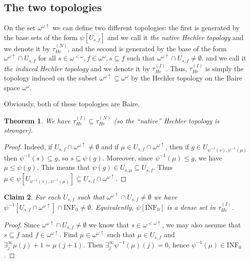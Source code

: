 \documentclass[12pt]{amsart}
\theoremstyle{plain}
\newtheorem{theorem}{Theorem}[section]
\newtheorem{claim}[theorem]{Claim}
\theoremstyle{definition}
\theoremstyle{remark}
\newcommand{\baire}{\omega^{\omega}}
\newcommand{\finbaire}{\omega^{<\omega}}
\newcommand{\finincrbaire}{\omega^{< \omega \uparrow}}
\newcommand{\incrbaire}{\omega^{\omega \uparrow}}
\newcommand{\inversepsi}{\psi^{-1}}
\newcommand{\Hechler}[2]{U_{#1,#2}}
\newcommand{\HechlerNative}{\tau_{\mathit{He}}^{(N)}}
\newcommand{\HechlerInduced}{\tau_{\mathit{He}}^{(I)}}
\newcommand{\ffid}{\inversepsi}
\newcommand{\INFZero}{\mathrm{INF}_0}
\begin{document}
\subsection{The two topologies}

On the set $\incrbaire$ we can define two different topologies:
the first is generated by the base sets of the form
$\psi[\Hechler{s}{f}]$
and we call it {\it the native Hechler topology} and
we denote it by $\HechlerNative$, and the second is generated by the base
of the form $\incrbaire \cap \Hechler{s}{f}$ for
all $s \in \finbaire, f \in \baire, s \subseteq f$
such that $\incrbaire \cap \Hechler{s}{f} \not= \emptyset$. 
and we call it {\it the induced Hechler topology}
and we denote it by $\HechlerInduced$.
Thus, $\HechlerInduced$ is simply the topology induced on
the subset $\incrbaire\subseteq\baire$
by the Hechler topology on the Baire space $\baire$.

Obviously, both of these topologies are Baire.

\begin{theorem}\label{theorem:native-stronger-than-induced} We have
$\HechlerInduced \subseteq \HechlerNative$ (so the ``native'' Hechler
topology is stronger).
\end{theorem}
\begin{proof}
Indeed, if $\Hechler{s}{f} \cap \incrbaire \not=\emptyset$
and if $\mu \in \Hechler{s}{f} \cap \incrbaire$, then
if $g \in \Hechler{\ffid(s)}{\ffid(\mu)}$ then
$\ffid(s) \subseteq g$, so $s \subseteq \psi(g)$.
Moreover, since $\ffid(\mu) \leq g$, we have
$\mu \leq \psi(g)$. This means that
$\psi(g) \in \Hechler{s}{\mu} \subseteq \Hechler{s}{f}$.
Thus $\mu \in \psi[\Hechler{\ffid(s)}{\ffid(\mu)}] \subseteq
  \Hechler{s}{f} \cap \incrbaire$.
\end{proof}

\begin{claim}
  \label{claim:about-inf-0}
For each $\Hechler{s}{f}$ such that
$\incrbaire \cap \Hechler{s}{f} \not= \emptyset$
we have
$\ffid[\Hechler{s}{f} \cap \incrbaire] \cap \INFZero \not= \emptyset$.
Equivalently, $\psi[\INFZero]$ is a dense set in
$\HechlerInduced$.
\end{claim}
\begin{proof}
  Since $\incrbaire \cap \Hechler{s}{f} \not= \emptyset$
we know that $s \in \finincrbaire$, we may also assume that
$s \subseteq f$ and $f \in \incrbaire$. Find $\mu \in \incrbaire$
such that $\mu \in \Hechler{s}{f}$ and
$\exists_j^\infty \mu(j) + 1 = \mu(j + 1)$.
Then $\exists_j^\infty \ffid(\mu)(j) = 0$,
hence $\ffid(\mu) \in \INFZero$.
\end{proof}
\end{document}
